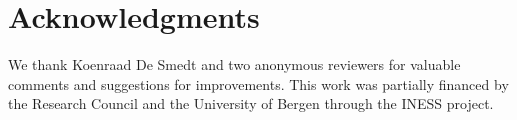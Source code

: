 \documentclass[output=paper]{langsci/langscibook}
\begin{document}

\section*{Acknowledgments}
We thank Koenraad De Smedt and two anonymous reviewers for valuable comments and suggestions for improvements.
This work was partially financed by the  Research Council and the University of Bergen through the INESS project.

 

{\sloppy\printbibliography[heading=subbibliography,notkeyword=this]}
\end{document}
